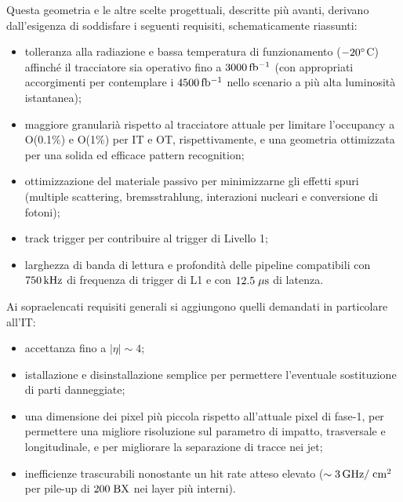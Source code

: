 Questa geometria e le altre scelte progettuali, descritte pi\`u avanti, derivano dall'esigenza di soddisfare i seguenti requisiti, schematicamente riassunti:
\begin{itemize}
\item tolleranza alla radiazione e bassa temperatura di funzionamento ($-20^\circ$C) affinch\'e il tracciatore sia operativo fino a $3000{\rm \, fb^{-1}}$ (con appropriati accorgimenti per contemplare i $4500{\rm \, fb^{-1}}$ nello scenario a pi\`u alta luminosit\`a istantanea);
\item maggiore granulari\`a rispetto al tracciatore attuale per limitare l'occupancy a O(0.1\%) e O(1\%) per IT e OT, rispettivamente, e una geometria ottimizzata per una solida ed efficace pattern recognition; 
\item ottimizzazione del materiale passivo per minimizzarne gli effetti spuri (multiple scattering, bremsstrahlung, interazioni nucleari e conversione di fotoni);
\item track trigger per contribuire al trigger di Livello 1;
\item larghezza di banda di lettura e profondit\`a delle pipeline compatibili con $750{\rm \, kHz}$ di frequenza di trigger di L1 e con $12.5\; \mu \rm s$ di latenza.
\end{itemize}
Ai sopraelencati requisiti generali si aggiungono quelli demandati in particolare all'IT:
\begin{itemize}
\item accettanza fino a $|\eta|\sim4$;
\item istallazione e disinstallazione semplice per permettere l'eventuale sostituzione di parti danneggiate;
\item una dimensione dei pixel pi\`u piccola rispetto all'attuale pixel di fase-1, per permettere una migliore risoluzione sul parametro di impatto, trasversale e longitudinale, e per migliorare la separazione di tracce nei jet;
\item inefficienze trascurabili nonostante un hit rate atteso elevato ($\sim 3{\rm \, GHz}/\rm \; cm^2$ per pile-up di $200\rm \; BX$ nei layer pi\`u interni).
\end{itemize}

